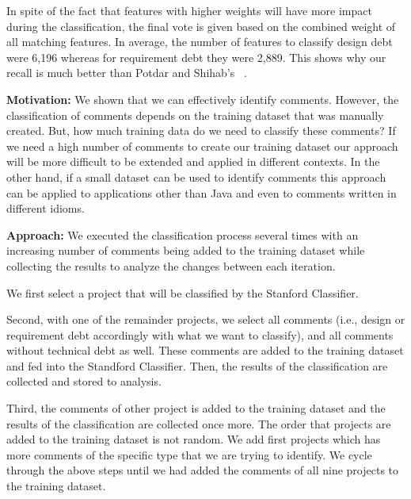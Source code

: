 In spite of the fact that features with higher weights will have more impact during the classification, the final vote is given based on the combined weight of all matching features. In average, the number of features to classify design debt were 6,196 whereas for requirement debt they were 2,889. This shows why our recall is much better than Potdar and Shihab's ~\cite{Potdar2014ICSME}. 


\vspace{3mm}
\noindent\rqiii
\vspace{3mm}

\noindent \textbf{Motivation:} We shown that we can effectively identify \SATD comments. However, the classification of \SATD comments depends on the training dataset that was manually created. But, how much training data do we need to classify these comments? If we need a high number of comments to create our training dataset our approach will be more difficult to be extended and applied in different contexts. In the other hand, if a small dataset can be used to identify \SATD comments this approach can be applied to applications other than Java and even to comments written in different idioms. 

\vspace{1mm}
\noindent \textbf{Approach:} We executed the classification process several times with an increasing number of comments being added to the training dataset while collecting the results to analyze the changes between each iteration.

We first select a project that will be classified by the Stanford Classifier.

Second, with one of the remainder projects, we select all \SATD comments (i.e., design or requirement debt accordingly with what we want to classify), and all comments without technical debt as well. These comments are added to the training dataset and fed into the Standford Classifier. Then, the results of the classification are collected and stored to analysis.

Third, the comments of other project is added to the training dataset and the results of the classification are collected once more. The order that projects are added to the training dataset is not random. We add first projects which has more \SATD comments of the specific type that we are trying to identify. We cycle through the above steps until we had added the comments of all nine projects to the training dataset.

